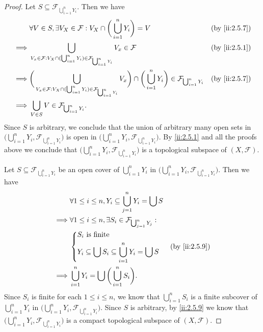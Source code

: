 \begin{proof}
  Let \(S \subseteq \mathcal{F}_{\bigcup_{i = 1}^n Y_i}\).
  Then we have
  \begin{align*}
             & \forall V \in S, \exists V_X \in \mathcal{F} : V_X \cap \bigg(\bigcup_{i = 1}^n Y_i\bigg) = V                                                                                                           &  & \by{ii:2.5.7} \\
    \implies & \bigcup_{V_x \in \mathcal{F} : V_X \cap (\bigcup_{i = 1}^n Y_i) \in \mathcal{F}_{\bigcup_{i = 1}^n Y_i}} V_x \in \mathcal{F}                                                                            &  & \by{ii:2.5.1} \\
    \implies & \bigg(\bigcup_{V_x \in \mathcal{F} : V_X \cap (\bigcup_{i = 1}^n Y_i) \in \mathcal{F}_{\bigcup_{i = 1}^n Y_i}} V_x\bigg) \cap \bigg(\bigcup_{i = 1}^n Y_i\bigg) \in \mathcal{F}_{\bigcup_{i = 1}^n Y_i} &  & \by{ii:2.5.7} \\
    \implies & \bigcup_{V \in S} V \in \mathcal{F}_{\bigcup_{i = 1}^n Y_i}.
  \end{align*}
  Since \(S\) is arbitrary, we conclude that the union of arbitrary many open sets in \(\big(\bigcup_{i = 1}^n Y_i, \mathcal{F}_{\bigcup_{i = 1}^n Y_i}\big)\) is open in \(\big(\bigcup_{i = 1}^n Y_i, \mathcal{F}_{\bigcup_{i = 1}^n Y_i}\big)\).
  By \cref{ii:2.5.1} and all the proofs above we conclude that \(\big(\bigcup_{i = 1}^n Y_i, \mathcal{F}_{\bigcup_{i = 1}^n Y_i}\big)\) is a topological subspace of \((X, \mathcal{F})\).

  Let \(S \subseteq \mathcal{F}_{\bigcup_{i = 1}^n Y_i}\) be an open cover of \(\bigcup_{i = 1}^n Y_i\) in \(\big(\bigcup_{i = 1}^n Y_i, \mathcal{F}_{\bigcup_{i = 1}^n Y_i}\big)\).
  Then we have
  \begin{align*}
             & \forall 1 \leq i \leq n, Y_i \subseteq \bigcup_{j = 1}^n Y_i = \bigcup S       \\
    \implies & \forall 1 \leq i \leq n, \exists S_i \in \mathcal{F}_{\bigcup_{j = 1}^n Y_j} : \\
             & \begin{dcases}
                 S_i \text{ is finite} \\
                 Y_i \subseteq \bigcup S_i \subseteq \bigcup_{i = 1}^n Y_i = \bigcup S
               \end{dcases}          &  & \by{ii:2.5.9}           \\
    \implies & \bigcup_{i = 1}^n Y_i = \bigcup \bigg(\bigcup_{i = 1}^n S_i\bigg).
  \end{align*}
  Since \(S_i\) is finite for each \(1 \leq i \leq n\), we know that \(\bigcup_{i = 1}^n S_i\) is a finite subcover of \(\bigcup_{i = 1}^n Y_i\) in \(\big(\bigcup_{i = 1}^n Y_i, \mathcal{F}_{\bigcup_{i = 1}^n Y_i}\big)\).
  Since \(S\) is arbitrary, by \cref{ii:2.5.9} we know that \(\big(\bigcup_{i = 1}^n Y_i, \mathcal{F}_{\bigcup_{i = 1}^n Y_i}\big)\) is a compact topological subspace of \((X, \mathcal{F})\).


\end{proof}
